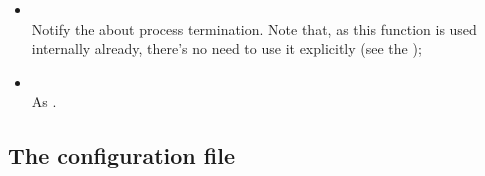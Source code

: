 \begin{enumerate}
\begin{itemize}
                \item {} \\
                    Notify the  about process termination.
                    Note that, as this function is used internally
                    already, there's no need to use it explicitly
                    (see the );

                \item {} \\
                    As .

                \end{itemize}
        \end{enumerate}

\subsection{The configuration file} \label{sub:ConfigurationFile}


